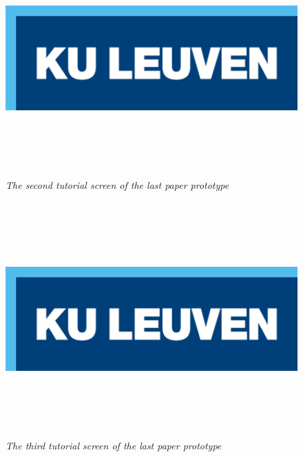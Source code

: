 \begin{figure}[H]
	\begin{center}
		\includegraphics[width=16cm, height=9cm]{KUL.png}
		\caption{\emph{The second tutorial screen of the last paper prototype}}
		\label{The second tutorial screen of the last paper prototype}
	\end{center}
\end{figure}

\begin{figure}[H]
	\begin{center}
		\includegraphics[width=16cm, height=9cm]{KUL.png}
		\caption{\emph{The third tutorial screen of the last paper prototype}}
		\label{The third tutorial screen of the last paper prototype}
	\end{center}
\end{figure}

